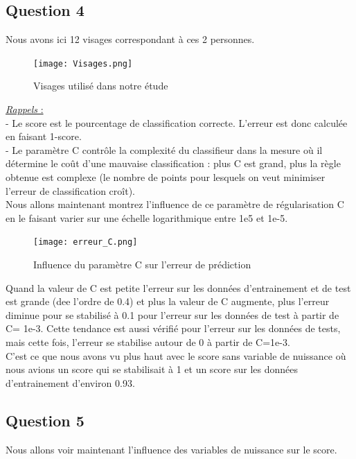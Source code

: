 \documentclass{article}
\begin{document}
\subsection{Question 4}
Nous avons ici 12 visages correspondant à ces 2 personnes.

\begin{figure}[H]
    \centering
    \texttt{[image: Visages.png]}
    \caption{Visages utilisé dans notre étude}
    \label{fig3}
\end{figure}

\underline{\textit{Rappels} :} \\
- Le score est le pourcentage de classification correcte. L'erreur est donc calculée en faisant 1-score.\\
- Le paramètre C contrôle la complexité du classifieur dans la mesure où il détermine le coût d’une mauvaise classification : plus C est grand, plus la règle obtenue est complexe (le nombre de points pour lesquels on veut minimiser l’erreur de classification croît).\\

Nous allons maintenant montrez l’influence de ce paramètre de régularisation C en le faisant varier sur une échelle logarithmique entre 1e5 et 1e-5.\\

\begin{figure}[H]
    \centering
    \texttt{[image: erreur\_C.png]}
    \caption{Influence du paramètre C sur l'erreur de prédiction}
    \label{fig4}
\end{figure}

Quand la valeur de C est petite l'erreur sur les données d'entrainement et de test est grande (dee l'ordre de 0.4) et plus la valeur de C augmente, plus l'erreur diminue pour se stabilisé à 0.1 pour l'erreur sur les données de test à partir de C= 1e-3. Cette tendance est aussi vérifié pour l'erreur sur les données de tests, mais cette fois, l'erreur se stabilise autour de 0 à partir de C=1e-3.\\
C'est ce que nous avons vu plus haut avec le score sans variable de nuissance où nous avions un score qui se stabilisait à 1 et un score sur les données d'entrainement d'environ 0.93.

\newpage
\subsection{Question 5}
Nous allons voir maintenant l'influence des variables de nuissance sur le score. \\
\end{document}
